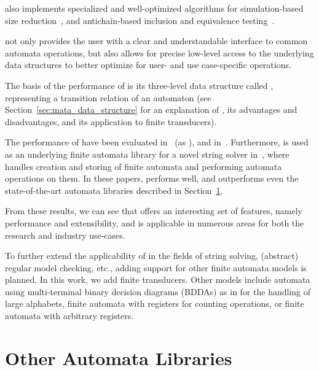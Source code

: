 \mata also implements specialized and well-optimized algorithms for simulation-based size reduction~\cite{ranzato_efficient_2010, treesimulation08}, and antichain-based inclusion and equivalence testing~\cite{doyen-antichain-10}.

\mata not only provides the user with a clear and understandable interface to common automata operations, but also allows for precise low-level access to the underlying data structures to better optimize for user- and use case-specific operations.

The basis of the performance of \mata is its three-level data structure called \deltastruct, representing a transition relation of an automaton (see Section~\ref{sec:mata_data_structure} for an explanation of \deltastruct, its advantages and disadvantages, and its application to finite transducers).

The performance of \mata have been evaluated in~\cite{cade23_reasoning_regular_properties_comparision_DBLP:conf/cade/FiedorHHRSV23} (as \enfa), and in~\cite{tacas24_mata_10.1007/978-3-031-57249-4_7}.
Furthermore, \mata is used as an underlying finite automata library for a novel string solver \noodler in~\cite{fm23_equations_synergy_regular_constraints_DBLP:conf/fm/BlahoudekCCHHLS23, oopsla23_stabilization_DBLP:journals/pacmpl/ChenCHHLS23,tacas24_noodler_10.1007/978-3-031-57246-3_2}, where \mata handles creation and storing of finite automata and performing automata operations on them.
In these papers, \mata performs well, and outperforms even the state-of-the-art automata libraries described in Section~\ref{sec:other_automata_libraries}.

From these results, we can see that \mata offers an interesting set of features, namely performance and extensibility, and is applicable in numerous areas for both the research and industry use-cases.

To further extend the applicability of \mata in the fields of string solving, (abstract) regular model checking, etc., adding support for other finite automata models is planned.
In this work, we add finite transducers.
Other models include automata using multi-terminal binary decision diagrams (BDDAs) as in \mona for the handling of large alphabets, finite automata with registers for counting operations, or finite automata with arbitrary registers.



\section{Other Automata Libraries}
\label{sec:other_automata_libraries}

